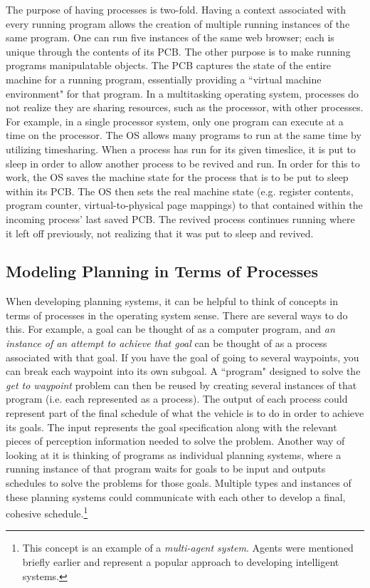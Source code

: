 The purpose of having processes is two-fold. Having a context associated with every running program allows the creation of multiple running instances of the same program. One can run five instances of the same web browser; each is unique through the contents of its PCB. The other purpose is to make running programs manipulatable objects. The PCB captures the state of the entire machine for a running program, essentially providing a ``virtual machine environment" for  that program. In a multitasking operating system, processes do not realize they are sharing resources, such as the processor, with other processes. For example, in a single processor system, only one program can execute at a time on the processor. The OS allows many programs to run at the same time by utilizing timesharing. When a process has run for its given timeslice, it is put to sleep in order to allow another process to be revived and run. In order for this to work, the OS saves the machine state for the process that is to be put to sleep within its PCB. The OS then sets the real machine state (e.g. register contents, program counter, virtual-to-physical page mappings) to that contained within the incoming process' last saved PCB. The revived process continues running where it left off previously, not realizing that it was put to sleep and revived.

\subsection{Modeling Planning in Terms of Processes}
When developing planning systems, it can be helpful to think of concepts in terms of processes in the operating system sense. There are several ways to do this. For example, a goal can be thought of as a computer program, and \textit{an instance of an attempt to achieve that goal} can be thought of as a process associated with that goal. If you have the goal of going to several waypoints, you can break each waypoint into its own subgoal. A ``program" designed to solve the \textit{get to waypoint} problem can then be reused by creating several instances of that program (i.e. each represented as a process). The output of each process could represent part of the final schedule of what the vehicle is to do in order to achieve its goals. The input represents the goal specification along with the relevant pieces of perception information needed to solve the problem. Another way of looking at it is thinking of programs as individual planning systems, where a running instance of that program waits for goals to be input and outputs schedules to solve the problems for those goals. Multiple types and instances of these planning systems could communicate with each other to develop a final, cohesive schedule.\footnote{This concept is an example of a \textit{multi-agent system}. Agents were mentioned briefly earlier and represent a popular approach to developing intelligent systems.}


